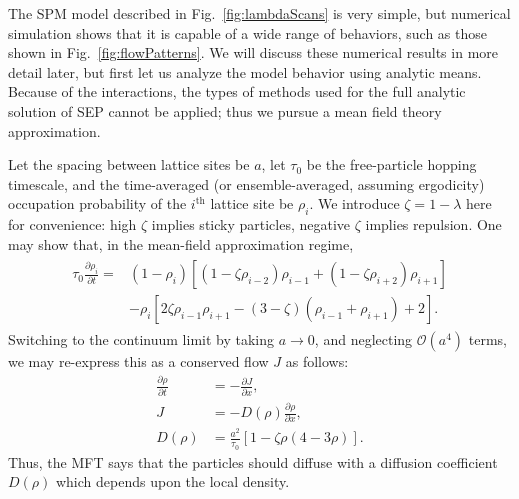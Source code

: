 \documentclass[
reprint,
 amsmath,amssymb,
 aps,
 prl
]{revtex4-1}
\newcommand{\partDeriv}[2]{\frac{\partial #1}{\partial #2}}
\begin{document}


The SPM model described in Fig.~\ref{fig:lambdaScans} is very simple,
but numerical simulation shows that it is capable of a wide range of
behaviors, such as those shown in Fig.~\ref{fig:flowPatterns}. We will
discuss these numerical results in more detail later, but first let us
analyze the model behavior using analytic means.  Because of the
interactions, the types of methods used for the full analytic
solution of SEP cannot be applied; thus we pursue a
mean field theory approximation.  

Let the spacing between lattice sites be $a$, let $\tau_0$ be the
free-particle hopping timescale, and the time-averaged (or
ensemble-averaged, assuming ergodicity) occupation probability of the
$i^{\mathrm{th}}$ lattice site be $\rho_i$.  We introduce $\zeta = 1 -
\lambda $ here for convenience: high $\zeta$ implies sticky particles,
negative $\zeta$ implies repulsion.  One may show that, in the
mean-field approximation regime,
\begin{align}
\begin{split}
 \tau_0 \partDeriv{\rho_i}{t} = &\left( 1-\rho_i \right) \left[ \left(1-\zeta\rho_{i-2} \right) \rho_{i-1} + \left(1-\zeta\rho_{i+2} \right) \rho_{i+1} \right] \\
 &- \rho_i \left[ 2 \zeta \rho_{i-1} \rho_{i+1}  - (3-\zeta)\left(\rho_{i-1} + \rho_{i+1}\right) + 2 \right].
 \end{split}
 \end{align}
Switching to the continuum limit by taking $a\rightarrow 0$, and neglecting $\mathcal{O}(a^4)$ terms, we may re-express this as a conserved flow $J$ as follows:
\begin{align}
 \partDeriv{\rho}{t} &= - \partDeriv{J}{x}, \\
 J &= -  D(\rho) \partDeriv{\rho}{x}, \\
 D(\rho) &= \frac{a^2}{\tau_0} \left[1 - \zeta \rho\left(4-3\rho\right) \right]. \label{eq:diffCoeff} 
\end{align}
Thus, the MFT says that the particles should diffuse with a diffusion coefficient $D(\rho)$ which depends upon the local density.
\end{document}
